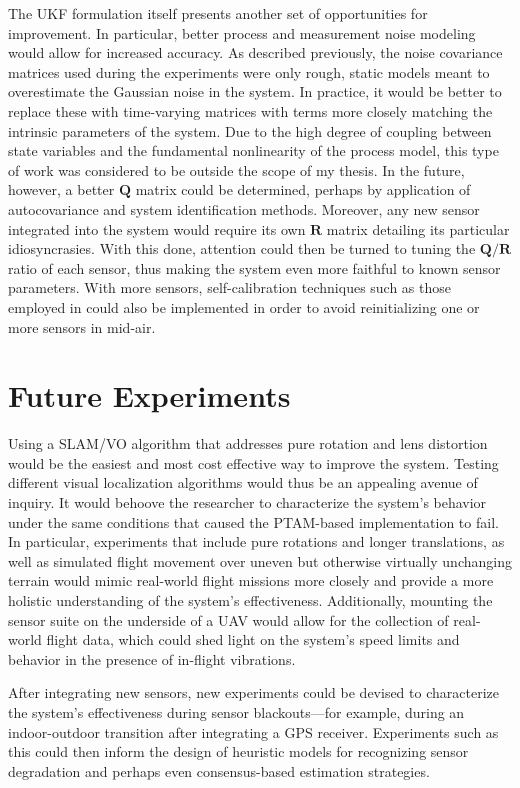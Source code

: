 The UKF formulation itself presents another set of opportunities for improvement. In particular, better process and measurement noise modeling would allow for increased accuracy. As described previously, the noise covariance matrices used during the experiments were only rough, static models meant to overestimate the Gaussian noise in the system. In practice, it would be better to replace these with time-varying matrices with terms more closely matching the intrinsic parameters of the system. Due to the high degree of coupling between state variables and the fundamental nonlinearity of the process model, this type of work was considered to be outside the scope of my thesis. In the future, however, a better $\mathbf{Q}$ matrix could be determined, perhaps by application of autocovariance and system identification methods. Moreover, any new sensor integrated into the system would require its own $\mathbf{R}$ matrix detailing its particular idiosyncrasies. With this done, attention could then be turned to tuning the $\mathbf{Q} / \mathbf{R}$ ratio of each sensor, thus making the system even more faithful to known sensor parameters. With more sensors, self-calibration techniques such as those employed in \cite{Weiss2012} could also be implemented in order to avoid reinitializing one or more sensors in mid-air.

\section{Future Experiments}

Using a SLAM/VO algorithm that addresses pure rotation and lens distortion would be the easiest and most cost effective way to improve the system. Testing different visual localization algorithms would thus be an appealing avenue of inquiry. It would behoove the researcher to characterize the system's behavior under the same conditions that caused the PTAM-based implementation to fail. In particular, experiments that include pure rotations and longer translations, as well as simulated flight movement over uneven but otherwise virtually unchanging terrain would mimic real-world flight missions more closely and provide a more holistic understanding of the system's effectiveness. Additionally, mounting the sensor suite on the underside of a UAV would allow for the collection of real-world flight data, which could shed light on the system's speed limits and behavior in the presence of in-flight vibrations.

After integrating new sensors, new experiments could be devised to characterize the system's effectiveness during sensor blackouts---for example, during an indoor-outdoor transition after integrating a GPS receiver. Experiments such as this could then inform the design of heuristic models for recognizing sensor degradation and perhaps even consensus-based estimation strategies. 

